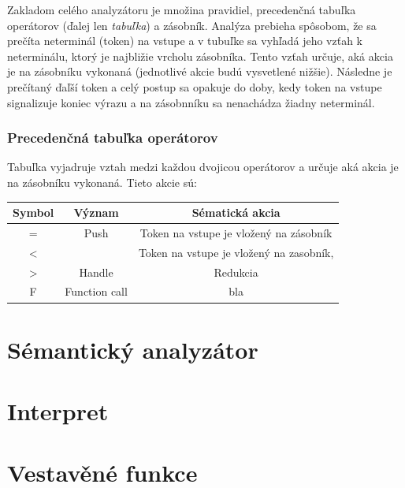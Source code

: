 \documentclass[a4paper,11pt]{article}
\begin{document}
Zakladom celého analyzátoru je množina pravidiel, precedenčná tabuľka operátorov (ďalej len \textit{tabuľka}) a zásobník. Analýza prebieha spôsobom, že sa prečíta neterminál (token) na vstupe a v tubuľke sa vyhľadá jeho vzťah k neterminálu, ktorý je najbližie vrcholu zásobníka. Tento vzťah určuje, aká akcia je na zásobníku vykonaná (jednotlivé akcie budú vysvetlené nižšie). Následne je prečítaný ďaľší token a celý postup sa opakuje do doby, kedy token na vstupe signalizuje koniec výrazu a na zásobnníku sa nenachádza žiadny neterminál.

\subsubsection{Precedenčná tabuľka operátorov}

Tabuľka vyjadruje vztah medzi každou dvojicou operátorov a určuje aká akcia je na zásobníku vykonaná. Tieto akcie sú:

\begin{table}[]
\centering
\label{my-label}
\begin{tabular}{@{}ccc@{}}
\toprule
Symbol       & Význam                            & Sématická akcia                         \\ \midrule
=            & Push                              & Token na vstupe je vložený na zásobník  \\
\textless    &                                   & Token na vstupe je vložený na zasobník, \\
\textgreater & Handle                            & Redukcia                                \\
F            & Function call                     & bla                                     \\ \bottomrule
\end{tabular}
\end{table}

\section{Sémantický analyzátor}


\section{Interpret}

\section{Vestavěné funkce}
\end{document}
